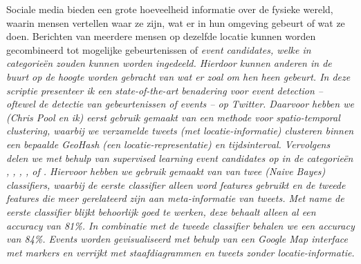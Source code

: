 {}
Sociale media bieden een grote hoeveelheid informatie over de fysieke wereld, 
waarin mensen vertellen waar ze zijn, wat er in hun
omgeving gebeurt of wat ze doen. Berichten van meerdere mensen op dezelfde 
locatie kunnen worden gecombineerd tot mogelijke gebeurtenissen of \it{event candidates},
welke in categorie\"en zouden kunnen worden ingedeeld.
Hierdoor kunnen anderen in de buurt op de hoogte worden gebracht van wat er zoal
om hen heen gebeurt.
\vl
In deze scriptie presenteer ik een \it{state-of-the-art} benadering voor 
\it{event detection} – oftewel de detectie van gebeurtenissen of \it{events} – 
op Twitter. Daarvoor hebben we (Chris Pool en ik) eerst
gebruik gemaakt van een methode voor \it{spatio-temporal clustering}, waarbij 
we verzamelde tweets (met locatie-informatie) clusteren binnen een bepaalde \it{GeoHash} (een locatie-representatie) en 
tijdsinterval. Vervolgens delen we met behulp van \it{supervised learning} event candidates op in de categorie\"en , 
, , ,
 of . Hiervoor hebben we gebruik gemaakt van van twee
(\it{Naive Bayes}) \it{classifiers}, waarbij de eerste classifier alleen 
\it{word features}
gebruikt en de tweede features die meer gerelateerd zijn aan 
\it{meta-informatie} van tweets.
Met name de eerste classifier blijkt behoorlijk goed te werken, deze behaalt 
alleen al een \it{accuracy} van 81\%. In combinatie met de tweede classifier
behalen we een accuracy van 84\%. Events worden gevisualiseerd met behulp
van een \it{Google Map interface} met \it{markers} en verrijkt met staafdiagrammen en
tweets zonder locatie-informatie.
\vspace{\fill}

\newpage

